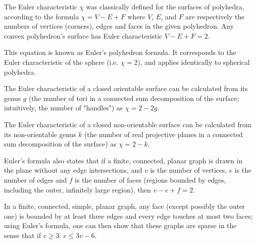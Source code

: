 The Euler characteristic $\chi$ was classically defined for the surfaces of polyhedra, according to the formula
$\chi =V-E+F$
where $V$, $E$, and $F$ are respectively the numbers of vertices (corners), edges and faces in the given polyhedron. Any convex polyhedron's surface has Euler characteristic
$V-E+F=2.$

This equation is known as Euler's polyhedron formula. It corresponds to the Euler characteristic of the sphere (i.e. $\chi = 2$), and applies identically to spherical polyhedra.

The Euler characteristic of a closed orientable surface can be calculated from its genus $g$ (the number of tori in a connected sum decomposition of the surface; intuitively, the number of "handles") as
$\chi=2-2g.$

The Euler characteristic of a closed non-orientable surface can be calculated from its non-orientable genus $k$ (the number of real projective planes in a connected sum decomposition of the surface) as
$\chi=2-k.$

Euler's formula also states that if a finite, connected, planar graph is drawn in the plane without any edge intersections, and $v$ is the number of vertices, $e$ is the number of edges and $f$ is the number of faces (regions bounded by edges, including the outer, infinitely large region), then
$v-e+f=2.$

In a finite, connected, simple, planar graph, any face (except possibly the outer one) is bounded by at least three edges and every edge touches at most two faces; using Euler's formula, one can then show that these graphs are sparse in the sense that if $v \ge 3$:
$e\leq 3v-6.$

